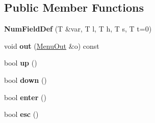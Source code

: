 \subsection*{Public Member Functions}
\begin{DoxyCompactItemize}
\item 
\mbox{\label{classAM5_1_1NumFieldDef_a36c219a8fd52659c179d10f9f495334e}} 
{\bfseries Num\+Field\+Def} (T \&var, T l, T h, T s, T t=0)
\item 
\mbox{\label{classAM5_1_1NumFieldDef_a4ffac67051309a17b512eafc2775ec38}} 
void {\bfseries out} (\hyperlink{structMenuOut}{Menu\+Out} \&o) const
\item 
\mbox{\label{classAM5_1_1NumFieldDef_a3f804c5d644b8df5aa3c7c35b268a689}} 
bool {\bfseries up} ()
\item 
\mbox{\label{classAM5_1_1NumFieldDef_af58241c4f75fae6d3fe3e8b6f9d3d91c}} 
bool {\bfseries down} ()
\item 
\mbox{\label{classAM5_1_1NumFieldDef_a353e92d4d1efc24e63c63168e1e6e660}} 
bool {\bfseries enter} ()
\item 
\mbox{\label{classAM5_1_1NumFieldDef_a21e480c321257532ac037187fe6cf98e}} 
bool {\bfseries esc} ()
\end{DoxyCompactItemize}
